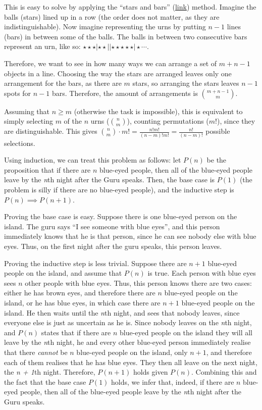 This is easy to solve by applying the ``stars and bars'' (\href{https://en.wikipedia.org/wiki/Stars_and_bars_(combinatorics)}{link}) method. Imagine the balls (stars) lined up in a row (the order does not matter, as they are indistinguishable). Now imagine representing the urns by putting $n - 1$ lines (bars) in between some of the balls. The balls in between two consecutive bars represent an urn, like so: $\star \star \star | \star \star || \star \star \star \star \star | \star \cdots$.

Therefore, we want to see in how many ways we can arrange a set of $m + n - 1$ objects in a line. Choosing the way the stars are arranged leaves only one arrangement for the bars, as there are $m$ stars, so arranging the stars leaves $n - 1$ spots for $n - 1$ bars. Therefore, the amount of arrangements is $\binom{m + n - 1}{m}$.

Assuming that $n \geq m$ (otherwise the task is impossible), this is equivalent to simply selecting $m$ of the $n$ urns ($\binom{n}{m}$), counting permutations ($m!$), since they are distinguishable. This gives $\binom{n}{m} \cdot m! = \frac{n!m!}{(n - m)!m!} = \frac{n!}{(n - m)!}$ possible selections.


Using induction, we can treat this problem as follows: let $P(n)$ be the proposition that if there are $n$ blue-eyed people, then all of the blue-eyed people leave by the \textit{n}th night after the Guru speaks. Then, the base case is $P(1)$ (the problem is silly if there are no blue-eyed people), and the inductive step is $P(n) \implies P(n + 1)$.

Proving the base case is easy. Suppose there is one blue-eyed person on the island. The guru says ``I see someone with blue eyes'', and this person immediately knows that he is that person, since he can see nobody else with blue eyes. Thus, on the first night after the guru speaks, this person leaves.

Proving the inductive step is less trivial. Suppose there are $n + 1$ blue-eyed people on the island, and assume that $P(n)$ is true. Each person with blue eyes sees $n$ other people with blue eyes. Thus, this person knows there are two cases: either he has brown eyes, and therefore there are $n$ blue-eyed people on the island, or he has blue eyes, in which case there are $n + 1$ blue-eyed people on the island. He then waits until the \textit{n}th night, and sees that nobody leaves, since everyone else is just as uncertain as he is. Since nobody leaves on the \textit{n}th night, and $P(n)$ states that if there are $n$ blue-eyed people on the island they will all leave by the \textit{n}th night, he and every other blue-eyed person immediately realise that there \textit{cannot} be $n$ blue-eyed people on the island, only $n + 1$, and therefore each of them realises that he has blue eyes. They then all leave on the next night, the \textit{n + 1}th night. Therefore, $P(n + 1)$ holds given $P(n)$. Combining this and the fact that the base case $P(1)$ holds, we infer that, indeed, if there are $n$ blue-eyed people, then all of the blue-eyed people leave by the \textit{n}th night after the Guru speaks.

